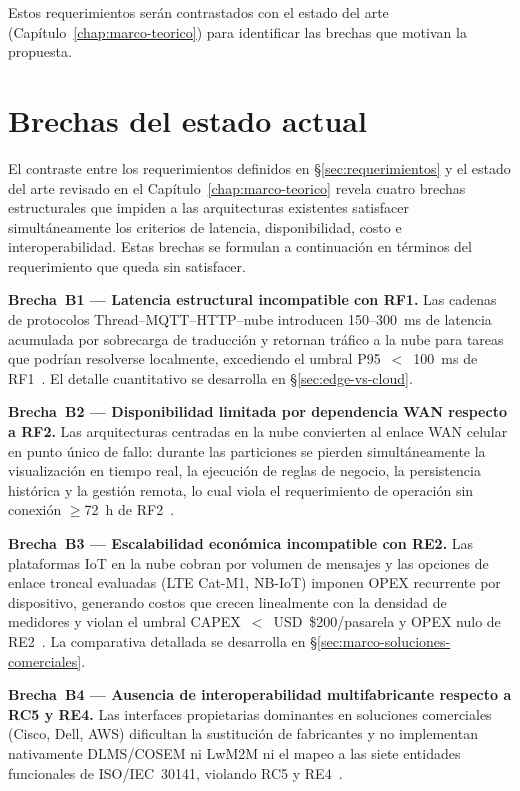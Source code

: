 Estos requerimientos serán contrastados con el estado del arte (Capítulo~\ref{chap:marco-teorico}) para identificar las brechas que motivan la propuesta.


\section{Brechas del estado actual}
\label{sec:brechas}

El contraste entre los requerimientos definidos en §\ref{sec:requerimientos} y el estado del arte revisado en el Capítulo~\ref{chap:marco-teorico} revela cuatro brechas estructurales que impiden a las arquitecturas existentes satisfacer simultáneamente los criterios de latencia, disponibilidad, costo e interoperabilidad. Estas brechas se formulan a continuación en términos del requerimiento que queda sin satisfacer.

\textbf{Brecha~B1 --- Latencia estructural incompatible con RF1.} Las cadenas de protocolos Thread--MQTT--HTTP--nube introducen 150--300~ms de latencia acumulada por sobrecarga de traducción y retornan tráfico a la nube para tareas que podrían resolverse localmente, excediendo el umbral P95~$<$~100~ms de RF1~\cite{laghariInternetThingsIoT2024}. El detalle cuantitativo se desarrolla en §\ref{sec:edge-vs-cloud}.

\textbf{Brecha~B2 --- Disponibilidad limitada por dependencia WAN respecto a RF2.} Las arquitecturas centradas en la nube convierten al enlace WAN celular en punto único de fallo: durante las particiones se pierden simultáneamente la visualización en tiempo real, la ejecución de reglas de negocio, la persistencia histórica y la gestión remota, lo cual viola el requerimiento de operación sin conexión $\geq$72~h de RF2~\cite{laghariInternetThingsIoT2024,NISTFramework2022}.

\textbf{Brecha~B3 --- Escalabilidad económica incompatible con RE2.} Las plataformas IoT en la nube cobran por volumen de mensajes y las opciones de enlace troncal evaluadas (LTE Cat-M1, NB-IoT) imponen OPEX recurrente por dispositivo, generando costos que crecen linealmente con la densidad de medidores y violan el umbral CAPEX~$<$~USD~\$200/pasarela y OPEX nulo de RE2~\cite{alsafranChallengesImplementingIoT2025,alsuwaidiSecuringSmartGrid2024}. La comparativa detallada se desarrolla en §\ref{sec:marco-soluciones-comerciales}.

\textbf{Brecha~B4 --- Ausencia de interoperabilidad multifabricante respecto a RC5 y RE4.} Las interfaces propietarias dominantes en soluciones comerciales (Cisco, Dell, AWS) dificultan la sustitución de fabricantes y no implementan nativamente DLMS/COSEM ni LwM2M ni el mapeo a las siete entidades funcionales de ISO/IEC~30141, violando RC5 y RE4~\cite{tangResearchInteroperabilityIoT,ISOIEC30141v2024}.

